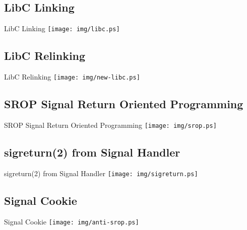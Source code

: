 \documentclass[14pt]{beamer}
\begin{document}
\subsection{LibC Linking}
\begin{frame}{LibC Linking}
\texttt{[image: img/libc.ps]}
\end{frame}

\subsection{LibC Relinking}
\begin{frame}{LibC Relinking}
\texttt{[image: img/new-libc.ps]}
\end{frame}

\subsection{SROP Signal Return Oriented Programming}
\begin{frame}{SROP Signal Return Oriented Programming}
\texttt{[image: img/srop.ps]}
\end{frame}

\subsection{sigreturn(2) from Signal Handler}
\begin{frame}{sigreturn(2) from Signal Handler}
\texttt{[image: img/sigreturn.ps]}
\end{frame}

\subsection{Signal Cookie}
\begin{frame}{Signal Cookie}
\texttt{[image: img/anti-srop.ps]}
\end{frame}
\end{document}
